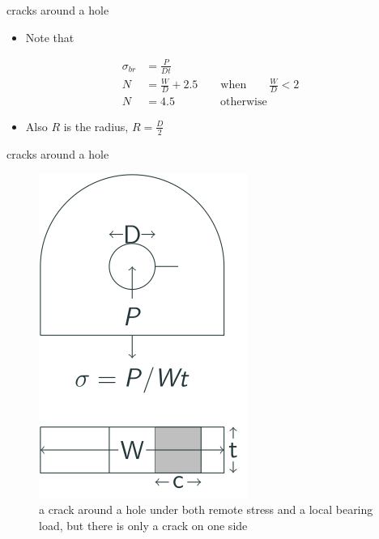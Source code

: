 \documentclass[
  letterpaper,
  ignorenonframetext,
  aspectratio=43,
  handout,
  12pt]{beamer}
\providecommand{\tightlist}{%
  \setlength{\itemsep}{0pt}\setlength{\parskip}{0pt}}
\providecommand{\tightlist}{%
\setlength{\itemsep}{0pt}\setlength{\parskip}{0pt}}
\let\Oldincludegraphics\includegraphics
\renewcommand{\includegraphics}[2][]{\Oldincludegraphics[width=\textwidth,height=0.7\textheight,keepaspectratio]{#2}}
\begin{document}
\begin{frame}{cracks around a hole}
\protect\hypertarget{cracks-around-a-hole-3}{}
\begin{itemize}
\tightlist
\item
  Note that
\end{itemize}

\[\begin{aligned}
  \sigma_{br} &= \frac{P}{Dt}\\
  N &= \frac{W}{D} + 2.5 \qquad \text{when} \qquad \frac{W}{D} < 2\\
  N &= 4.5 \qquad \qquad \text{otherwise}
\end{aligned}\]

\begin{itemize}
\tightlist
\item
  Also \(R\) is the radius, \(R= \frac{D}{2}\)
\end{itemize}
\end{frame}

\begin{frame}{cracks around a hole}
\protect\hypertarget{cracks-around-a-hole-4}{}
\begin{figure}
\centering
\includegraphics{../images/bearing-single.svg}
\caption{a crack around a hole under both remote stress and a local
bearing load, but there is only a crack on one side}
\end{figure}
\end{frame}
\end{document}
